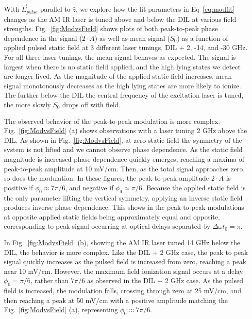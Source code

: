 \documentclass[aps,pra,preprint,groupedaddress]{revtex4-1}
\begin{document}
With $\vec{E}_{pulse}$ parallel to $\hat{z}$, we explore how the fit parameters in Eq~\ref{eq:modfit} changes as the AM IR laser is tuned above and below the DIL at various field strengths. Fig.~\ref{fig:ModvsField} shows plots of both peak-to-peak phase dependence in the signal ($2\cdot A$) as well as mean signal ($S_0$) as a function of applied pulsed static field at 3 different laser tunings, DIL + 2, -14, and -30 GHz. For all three laser tunings, the mean signal behaves as expected. The signal is largest when there is no static field applied, and the high lying states we detect are longer lived. As the magnitude of the applied static field increases, mean signal monotonously decreases as the high lying states are more likely to ionize. The further below the DIL the central frequency of the excitation laser is tuned, the more slowly $S_0$ drops off with field.

The observed behavior of the peak-to-peak modulation is more complex. Fig.~\ref{fig:ModvsField} (a) shows observations with a laser tuning 2 GHz above the DIL. As shown in Fig.~\ref{fig:ModvsField}, at zero static field the symmetry of the system is not lifted and we cannot observe phase dependence. As the static field magnitude is increased phase dependence quickly emerges, reaching a maxima of peak-to-peak amplitude at 10 mV/cm. Then, as the total signal approaches zero, so does the modulation. In these figures, the peak to peak amplitude $2 \cdot A$ is positive if $\phi_0 \approx 7\pi/6$, and negative if $\phi_0 \approx \pi/6$. Because the applied static field is the only parameter lifting the vertical symmetry, applying an inverse static field produces inverse phase dependence. This shows in the peak-to-peak modulations at opposite applied static fields being approximately equal and opposite, corresponding to peak signal occurring at optical delays separated by $\Delta \omega t_0 = \pi$.

In Fig.~\ref{fig:ModvsField} (b), showing the AM IR laser tuned 14 GHz below the DIL, the behavior is more complex. Like the DIL + 2 GHz case, the peak to peak signal quickly increases as the pulsed field is increased from zero, reaching a peak near 10 mV/cm. However, the maximum field ionization signal occurs at a delay $\phi_0 = \pi/6$, rather than $7\pi/6$ as observed in the DIL + 2 GHz case. As the pulsed field is increased, the modulation falls, crossing through zero at 25 mV/cm, and then reaching a peak at 50 mV/cm with a positive amplitude matching the Fig.~\ref{fig:ModvsField} (a), representing $\phi_0 \approx 7\pi/6$.
\end{document}
